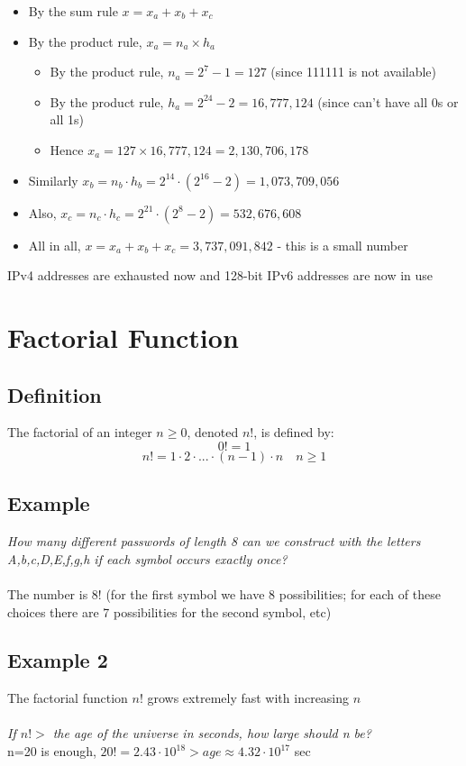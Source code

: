 \documentclass{article}[18pt]
\begin{document}
$ $
\begin{itemize}
\item By the sum rule $x=x_a+x_b+x_c$
\item By the product rule, $x_a=n_a\times h_a$
\begin{itemize}
\item By the product rule, $n_a=2^7-1=127$ (since 111111 is not available)
\item By the product rule, $h_a=2^{24}-2=16,777,124$ (since can't have all 0s or all 1s)
\item Hence $x_a=127\times 16,777,124=2,130,706,178$
\end{itemize}
\item Similarly $x_b=n_b\cdot h_b=2^{14}\cdot (2^16-2)=1,073,709,056$
\item Also, $x_c=n_c\cdot h_c=2^{21}\cdot(2^8-2)=532,676,608$
\item All in all, $x=x_a+x_b+x_c=3,737,091,842$ - this is a small number
\end{itemize}
IPv4 addresses are exhausted now and 128-bit IPv6 addresses are now in use
\section{Factorial Function}
\subsection{Definition}
The factorial of an integer $n\geqslant0$, denoted $n!$, is defined by:\\
$$0!=1$$
$$n!=1\cdot2\cdot...\cdot(n-1)\cdot n \quad n\geqslant 1$$
\subsection{Example}
\textit{How many different passwords of length 8 can we construct with the letters A,b,c,D,E,f,g,h if each symbol occurs exactly once?}\\
\\
The number is $8!$ (for the first symbol we have 8 possibilities; for each of these choices there are 7 possibilities for the second symbol, etc)
\subsection{Example 2}
The factorial function $n!$ grows extremely fast with increasing $n$\\
\\
\textit{If $n!>$ the age of the universe in seconds, how large should n be?}\\
n=20 is enough, $20!=2.43\cdot 10^{18}>age\approx 4.32\cdot 10^{17}$ sec
\end{document}
